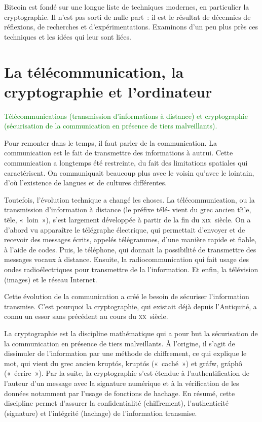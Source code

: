 Bitcoin est fondé sur une longue liste de techniques modernes, en particulier la cryptographie. Il n'est pas sorti de nulle part~: il est le résultat de décennies de réflexions, de recherches et d'expérimentations. Examinons d'un peu plus près ces techniques et les idées qui leur sont liées.

\section{La télécommunication, la cryptographie et l'ordinateur}

\textcolor{green}{Télécommunications (transmission d'informations à distance) et cryptographie (sécurisation de la communication en présence de tiers malveillants).}


Pour remonter dans le temps, il faut parler de la communication. La communication est le fait de transmettre des informations à autrui. Cette communication a longtemps été restreinte, du fait des limitations spatiales qui caractérisent. On communiquait beaucoup plus avec le voisin qu'avec le lointain, d'où l'existence de langues et de cultures différentes.

Toutefois, l'évolution technique a changé les choses. La télécommunication, ou la transmission d'information à distance (le préfixe télé- vient du grec ancien \foreignlanguage{greek}{t{\~h}le}, t{\~e}le, «~loin~»), s'est largement développée à partir de la fin du \textsc{xix}\ieme{}~siècle. On a d'abord vu apparaître le télégraphe électrique, qui permettait d'envoyer et de recevoir des messages écrits, appelés télégrammes, d'une manière rapide et fiable, à l'aide de codes. Puis, le téléphone, qui donnait la possibilité de transmettre des messages vocaux à distance. Ensuite, la radiocommunication qui fait usage des ondes radioélectriques pour transmettre de la l'information. Et enfin, la télévision (images) et le réseau Internet.


Cette évolution de la communication a créé le besoin de sécuriser l'information transmise. C'est pourquoi la cryptographie, qui existait déjà depuis l'Antiquité, a connu un essor sans précédent au cours du \textsc{xx}\ieme{}~siècle.

La cryptographie est la discipline mathématique qui a pour but la sécurisation de la communication en présence de tiers malveillants. À l'origine, il s'agit de dissimuler de l'information par une méthode de chiffrement, ce qui explique le mot, qui vient du grec ancien \foreignlanguage{greek}{kruptós}, kruptós («~caché~») et \foreignlanguage{greek}{gráfw}, gráphô («~écrire~»). Par la suite, la cryptographie s'est étendue à l'authentification de l'auteur d'un message avec la signature numérique et à la vérification de les données notamment par l'usage de fonctions de hachage. En résumé, cette discipline permet d'assurer la confidentialité (chiffrement), l'authenticité (signature) et l'intégrité (hachage) de l'information transmise.


